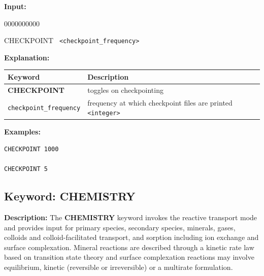 \documentclass[12pt]{article}
\begin{document}
{\noindent\bf Input:}

\begin{deflist}{0000000000}
\item [CHECKPOINT] \ {\tt <checkpoint\_frequency>}
\end{deflist}

{\noindent\bf Explanation:}

\begin{center}
\begin{tabularx}{\linewidth}{lX}
\toprule[1.5pt]
\bf Keyword & \bf Description\\
\midrule
\bf CHECKPOINT & toggles on checkpointing \\
{\tt checkpoint\_frequency} & frequency at which checkpoint files are printed {\tt<integer>} \\
\bottomrule
\end{tabularx}
\end{center}

\bigskip

\begin{mdframed}

{\noindent\bf Examples:}
\begin{verbatim}
CHECKPOINT 1000

CHECKPOINT 5
\end{verbatim}

\end{mdframed}

\hyperlink{target_key}{\return}

\newpage
\protect\hypertarget{target_chem}{}

\subsection{Keyword: CHEMISTRY}

\noindent
{\bf Description:}
The {\bf CHEMISTRY} keyword invokes the reactive transport mode and provides input for primary species, secondary species, minerals, gases, colloids and colloid-facilitated transport, and sorption including ion exchange and surface complexation. Mineral reactions are described through a kinetic rate law based on transition state theory and surface complexation reactions may involve equilibrium, kinetic (reversible or irreversible) or a multirate formulation.

\end{document}
